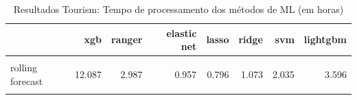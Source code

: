 \begin{apendicesenv}
\hypertarget{tbl-tourism-tempo-ml}{}
\begin{table}
\caption{\label{tbl-tourism-tempo-ml}Resultados Tourism: Tempo de processamento dos métodos de ML (em horas) }\tabularnewline

\centering
\begin{tabular}[t]{lrrrrrrr}
\toprule
  & xgb & ranger & elastic net & lasso & ridge & svm & lightgbm\\
\midrule
\cellcolor{gray!10}{fitted base} & \cellcolor{gray!10}{15.767} & \cellcolor{gray!10}{3.687} & \cellcolor{gray!10}{1.540} & \cellcolor{gray!10}{1.282} & \cellcolor{gray!10}{1.371} & \cellcolor{gray!10}{1.977} & \cellcolor{gray!10}{3.535}\\
rolling forecast & 12.087 & 2.987 & 0.957 & 0.796 & 1.073 & 2.035 & 3.596\\
\cellcolor{gray!10}{refit} & \cellcolor{gray!10}{24.627} & \cellcolor{gray!10}{15.386} & \cellcolor{gray!10}{6.006} & \cellcolor{gray!10}{4.968} & \cellcolor{gray!10}{5.323} & \cellcolor{gray!10}{10.474} & \cellcolor{gray!10}{19.362}\\
\bottomrule
\end{tabular}
\end{table}

\end{apendicesenv}

%
%
%

